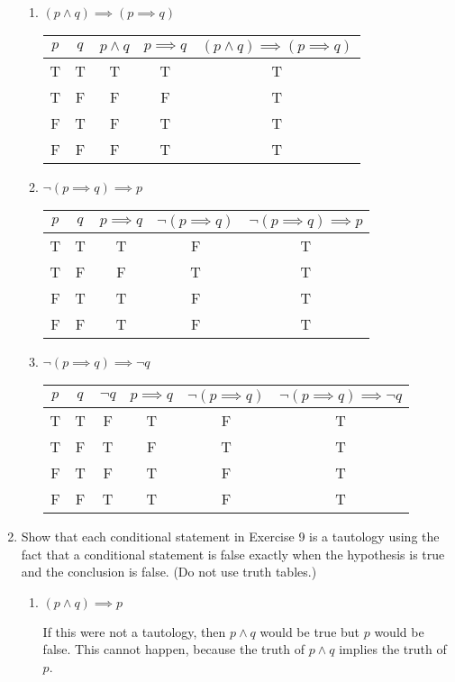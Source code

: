 \documentclass[11pt]{article}
\begin{document}
\begin{enumerate}[label=\textbf{\arabic*.}]
\begin{enumerate}[label=\textbf{\alph*)}]
		\item $(p \land q) \implies (p \implies q)$
		
		\begin{tabular}{c | c | c | c | c}
			$p$ & $q$ & $p \land q$ & $p \implies q$ & $(p \land q) \implies (p \implies q)$ \\
			\hline
			T & T & T & T & T \\
			T & F & F & F & T \\
			F & T & F & T & T \\
			F & F & F & T & T
		\end{tabular}
	
		\item $\neg(p \implies q) \implies p$
		
		\begin{tabular}{c | c | c | c | c}
			$p$ & $q$ & $p \implies q$ & $\neg(p \implies q)$ & $\neg(p \implies q) \implies p$ \\
			\hline
			T & T & T & F & T \\
			T & F & F & T & T \\
			F & T & T & F & T \\
			F & F & T & F & T
		\end{tabular}
		
		\item $\neg(p \implies q) \implies \neg q$
		
		\begin{tabular}{c | c | c | c | c | c}
			$p$ & $q$ & $\neg q$ & $p \implies q$ & $\neg(p \implies q)$ & $\neg(p \implies q) \implies \neg q$ \\
			\hline
			T & T & F & T & F & T \\
			T & F & T & F & T & T \\
			F & T & F & T & F & T \\
			F & F & T  &T & F & T
		\end{tabular}
	\end{enumerate}

	\item Show that each conditional statement in Exercise 9 is a tautology using the fact that a conditional statement is false exactly when the hypothesis is true and the conclusion is false. (Do not use truth tables.)
	\begin{enumerate}[label=\textbf{\alph*)}]
		\item $(p \land q) \implies p$
		
		If this were not a tautology, then $p \land q$ would be true but $p$ would be false. This cannot happen, because the truth of $p \land q$ implies the truth of $p$.
		

\end{enumerate}
\end{enumerate}
\end{document}
